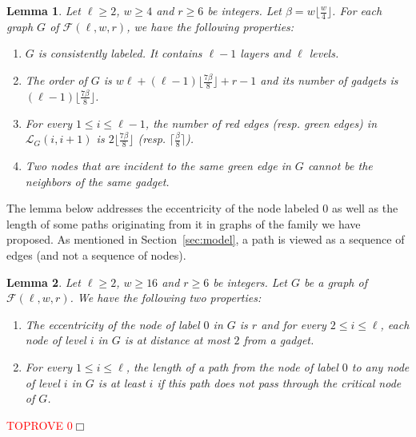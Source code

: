 \documentclass[11pt]{article}
\newtheorem{lemma}{Lemma}[section]
\newcommand{\qed}{\hfill $\Box$ \bigbreak}
\newenvironment{proof}{\noindent {\bf Proof.}}{\qed}
\begin{document}
\begin{lemma}
\label{lem:conse}
Let $\ell\geq 2$, $w\geq 4$ and $r\geq 6$ be integers. Let $\beta=w\lfloor\frac{w}{4}\rfloor$. For each graph $G$ of $\mathcal{F}(\ell,w,r)$, we have the following properties:
\begin{enumerate}
\item $G$ is consistently labeled. It contains $\ell-1$ layers and $\ell$ levels. 
\item The order of $G$ is $w\ell+ (\ell-1)\lfloor\frac{7\beta}{8}\rfloor+r-1$ and its number of gadgets is $(\ell-1)\lfloor\frac{7\beta}{8}\rfloor$.
\item For every $1\leq i \leq \ell-1$, the number of red edges (resp. green edges) in $\mathcal{L}_G(i,i+1)$ is $2\lfloor\frac{7\beta}{8}\rfloor$ (resp. $\lceil\frac{\beta}{8}\rceil$).
\item Two nodes that are incident to the same green edge in $G$ cannot be the neighbors of the same gadget.
\end{enumerate} 
\end{lemma}

The lemma below addresses the eccentricity of the node labeled $0$ as
well as the length of some paths originating from it in graphs of the
family we have proposed. As mentioned in Section~\ref{sec:model}, a path is viewed as a sequence of edges (and not a sequence of nodes).

\begin{lemma}
\label{lem:ecc}
Let $\ell\geq 2$, $w\geq 16$ and $r\geq 6$ be integers. Let $G$ be a graph of $\mathcal{F}(\ell,w,r)$. We have the following two properties:
\begin{enumerate}
\item The eccentricity of the node of label $0$ in $G$ is $r$ and for every $2\leq i\leq \ell$, each node of level $i$ in $G$ is at distance at most $2$ from a gadget.
\item For every $1\leq i\leq \ell$, the length of a path from the node of label $0$ to any node of level $i$ in $G$ is at least $i$ if this path does not pass through the critical node of $G$.
\end{enumerate}
\end{lemma}

\begin{proof}\textcolor{red}{TOPROVE 0}\end{proof}
\end{document}
